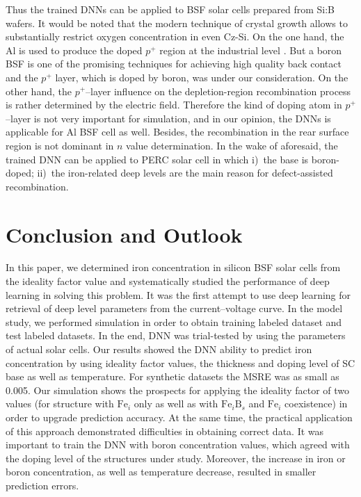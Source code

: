\documentclass[num-refs]{wiley-article} %
\begin{document}
Thus the trained DNNs can be applied to BSF solar cells prepared from Si:B wafers.
It would be noted that the modern  technique of crystal growth allows to substantially restrict
oxygen concentration in even Cz-Si.
On the one hand,  the Al is used to produce the doped $p^+$ region
at the industrial level \cite{GreenRew2019,WilsonRew2020}.
But a boron BSF is one of the promising techniques
for achieving high quality back contact \cite{Kim2007,B-BSF}
and the $p^{+}$ layer, which is doped by boron, was under our consideration.
On the other hand, the $p^+$--layer influence on the depletion-region recombination
process is rather determined by the electric field.
Therefore the kind of doping atom in $p^+$--layer is not very important for simulation,
and in our opinion, the  DNNs is applicable for Al BSF cell as well.
Besides, the recombination in the rear surface region is not dominant
in $n$ value determination.
In the wake of aforesaid, the trained DNN can be applied to PERC solar cell in which
i)~the base is boron-doped;
ii)~the iron-related deep levels are the main reason for defect-assisted recombination.




\section{Conclusion and Outlook}

In this paper,
we determined iron concentration in silicon BSF solar cells from
the ideality factor value and systematically studied the performance
of deep learning in solving this problem.
It was  the first attempt to use deep learning for retrieval of deep level parameters from the current--voltage curve.
In the model study,
we performed simulation in order to obtain training labeled dataset and test labeled datasets.
In the end, DNN was trial-tested by using the parameters of actual solar cells.
Our results showed the DNN ability
to predict iron concentration by using ideality factor values,
the thickness and doping level of SC base as well as temperature.
For synthetic datasets the MSRE was as small as 0.005.
Our simulation shows the prospects for applying the ideality factor of two values (for structure with $\mathrm{Fe}_i$ only as well as with $\mathrm{Fe}_i\mathrm{B}_s$ and
$\mathrm{Fe}_i$ coexistence)
in order to upgrade prediction accuracy.
At the same time, the practical application of this approach demonstrated difficulties in obtaining correct data.
It was important to train the DNN with boron concentration values,
which agreed with the doping level of the structures under study.
Moreover, the increase in iron or boron concentration, as well as temperature decrease,
resulted in smaller prediction errors.
\end{document}
